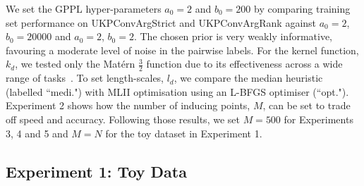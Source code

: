 We set the GPPL hyper-parameters $a_0=2$ and $b_0=200$ by comparing
training set performance on UKPConvArgStrict and UKPConvArgRank against $a_0=2$, $b_0=20000$ and $a_0=2$, $b_0=2$.
The chosen prior is very weakly informative, favouring a moderate level of noise in the pairwise labels.
For the kernel function, $k_d$, we tested only the 
Mat\'ern $\frac{3}{2}$ function due to its 
effectiveness across a wide range of tasks~\cite{rasmussen_gaussian_2006}.
To set length-scales, $l_d$, we compare the median heuristic (labelled ``medi.")
with MLII optimisation using an L-BFGS optimiser (``opt."). Experiment 2 shows how
the number of inducing points, $M$, can be set to trade off speed and accuracy. 
Following those results, we set $M=500$ for Experiments 3, 4 and 5 and $M=N$ for the toy dataset in Experiment 1.

\subsection{Experiment 1: Toy Data}

